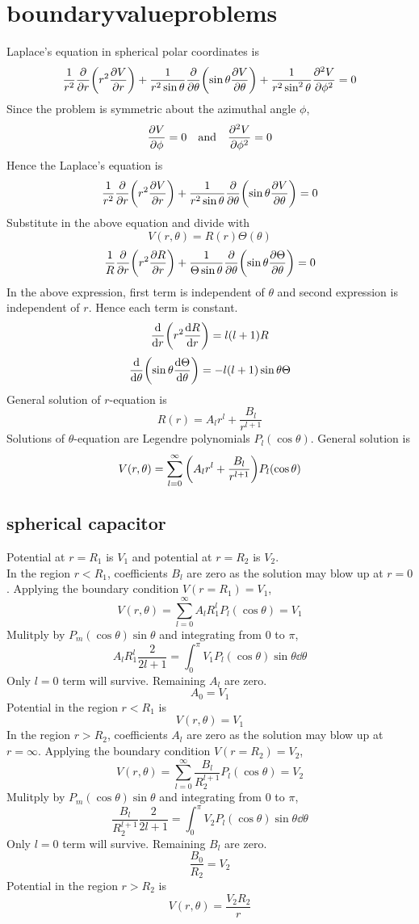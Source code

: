 \section*{boundaryvalueproblems}
Laplace's equation in spherical polar coordinates is 
\[\frac{1}{r^2}\pdv{r}\qty(r^2\pdv{V}{r})+\frac{1}{r^2\sin\theta}\pdv{\theta}\qty(\sin\theta\pdv{V}{\theta})+\frac{1}{r^2\sin^2\theta}\pdv[2]{V}{\phi}=0\]
Since the problem is symmetric about the azimuthal angle $\phi$, \[\pdv{V}{\phi}=0\qq{and}\pdv[2]{V}{\phi}=0\]
Hence the Laplace's equation is 
\[\frac{1}{r^2}\pdv{r}\qty(r^2\pdv{V}{r})+\frac{1}{r^2\sin\theta}\pdv{\theta}\qty(\sin\theta\pdv{V}{\theta})=0\]
Substitute in the above equation and divide with \[V(r,\theta)=R(r)\Theta(\theta)\]  
\[\frac{1}{R}\pdv{r}\qty(r^2\pdv{R}{r})+\frac{1}{\Theta\sin\theta}\pdv{\theta}\qty(\sin\theta\pdv{\Theta}{\theta})=0\]
In the above expression, first term is independent of $\theta$ and second expression is independent of $r$. Hence each term is constant.
\[\dv{r}\qty(r^2\dv{R}{r})=l(l+1)R\]
\[\dv{\theta}\qty(\sin\theta\dv{\Theta}{\theta})=-l(l+1)\sin\theta\Theta\]
General solution of $r$-equation is 
\[R(r)=A_lr^l+\frac{B_l}{r^{l+1}}\]
Solutions of $\theta$-equation are Legendre polynomials $P_l(\cos\theta)$. 
General solution is \[V(r,\theta)=\sum_{l=0}^{\infty}\qty(A_lr^l+\frac{B_l}{r^{l+1}})P_l(\cos\theta)\]
\subsection*{spherical capacitor}
Potential at $r=R_1$ is $V_1$ and potential at $r=R_2$ is $V_2$.\\
In the region $r<R_1$, coefficients $B_{l}$ are zero as the solution may blow up at $r=0$.
Applying the boundary condition $V(r=R_1)=V_1$,
\[V(r,\theta)=\sum_{l=0}^{\infty}A_{l}R_1^lP_l(\cos\theta)=V_1\]
Mulitply by $P_m(\cos\theta)\sin\theta$ and integrating from $0$ to $\pi$,
\[A_lR_1^l\frac{2}{2l+1}=\int_0^{\pi}V_1P_l(\cos\theta)\sin\theta\dd\theta\]
Only $l=0$ term will survive. Remaining $A_l$ are zero.
\[A_0=V_1\]
Potential in the region $r<R_1$ is \[V(r,\theta)=V_1\]
\newpage
In the region $r>R_2$, coefficients $A_{l}$ are zero as the solution may blow up at $r=\infty$.
Applying the boundary condition $V(r=R_2)=V_2$,
\[V(r,\theta)=\sum_{l=0}^{\infty}\frac{B_{l}}{R_2^{l+1}}P_l(\cos\theta)=V_2\]
Mulitply by $P_m(\cos\theta)\sin\theta$ and integrating from $0$ to $\pi$,
\[\frac{B_l}{R_2^{l+1}}\frac{2}{2l+1}=\int_0^{\pi}V_2P_l(\cos\theta)\sin\theta\dd\theta\]
Only $l=0$ term will survive. Remaining $B_l$ are zero.
\[\frac{B_0}{R_2}=V_2\]
Potential in the region $r>R_2$ is \[V(r,\theta)=\frac{V_2R_2}{r}\]